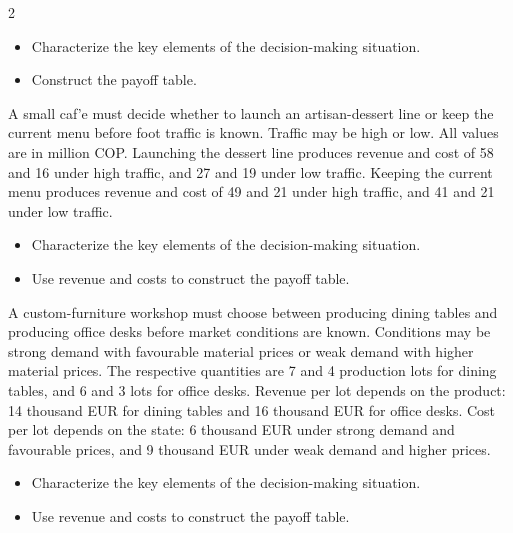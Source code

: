 \begin{multicols}{2}
		\begin{itemize}
			\item [\textbf{(C1)}] Characterize the key elements of the decision-making situation. 
			\item [\textbf{(C2)}] Construct the payoff table. 
		\end{itemize}
		
		
		A small caf'e must decide whether to launch an artisan-dessert line or keep the current menu before foot traffic is known. Traffic may be high or low. All values are in million COP. Launching the dessert line produces revenue and cost of 58 and 16 under high traffic, and 27 and 19 under low traffic. Keeping the current menu produces revenue and cost of 49 and 21 under high traffic, and 41 and 21 under low traffic.
		
		\begin{itemize}
			\item [\textbf{(C1)}] Characterize the key elements of the decision-making situation. 
			\item [\textbf{(C3)}] Use revenue and costs to construct the payoff table. 
		\end{itemize}
		
		\columnbreak 
		
			A custom-furniture workshop must choose between producing dining tables
		and producing office desks before market conditions are known. Conditions may be strong demand with favourable material prices or weak demand with higher material prices. The respective quantities are 7 and 4 production lots for dining tables, and 6 and 3 lots for office desks. Revenue per lot depends on the product: 14 thousand EUR for dining tables and 16 thousand EUR for office desks. Cost per lot depends on the state: 6 thousand EUR under strong demand and favourable prices, and 9 thousand EUR under weak demand and higher prices.
		
		\begin{itemize}
			\item [\textbf{(C1)}] Characterize the key elements of the decision-making situation. 
			\item [\textbf{(C3)}] Use revenue and costs to construct the payoff table. 
		\end{itemize}
		

\end{multicols}
